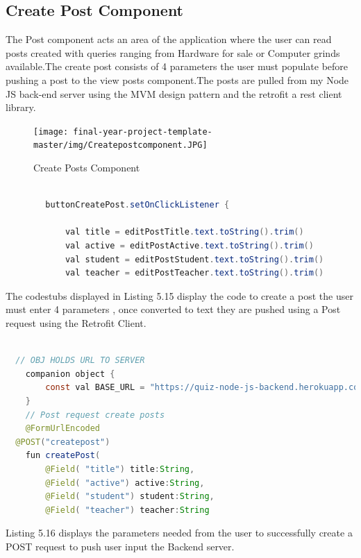 \subsection{Create Post Component}
The Post component acts an area of the application where the user can read posts created with queries ranging from Hardware for sale or Computer  grinds available.The create post consists of 4 parameters the user must populate before pushing a post to the view posts component.The posts are pulled from my Node JS back-end server using the MVM design pattern and the retrofit a rest client library\cite{retrofit}.

 \begin{figure}[H]
  \centering
    \texttt{[image: final-year-project-template-master/img/Createpostcomponent.JPG]}
     \caption{Create Posts Component}
\end{figure}


\begin{lstlisting}[language=Java, caption= user input from xml view ]

        buttonCreatePost.setOnClickListener {

            val title = editPostTitle.text.toString().trim()
            val active = editPostActive.text.toString().trim()
            val student = editPostStudent.text.toString().trim()
            val teacher = editPostTeacher.text.toString().trim()
\end{lstlisting}

The codestubs displayed in Listing 5.15 display the code to create a post the user must enter 4 parameters , once converted to text they are pushed using a Post request using the Retrofit Client. 

\begin{lstlisting}[language=Java, caption=Create Post Model for HTTP Post Retrofit request ]

  // OBJ HOLDS URL TO SERVER
    companion object {
        const val BASE_URL = "https://quiz-node-js-backend.herokuapp.com/"
    }
    // Post request create posts
    @FormUrlEncoded
  @POST("createpost")
    fun createPost(
        @Field( "title") title:String,
        @Field( "active") active:String,
        @Field( "student") student:String,
        @Field( "teacher") teacher:String

\end{lstlisting}

Listing  5.16 displays the parameters needed from the user to successfully create a POST request to push user input the Backend server.

